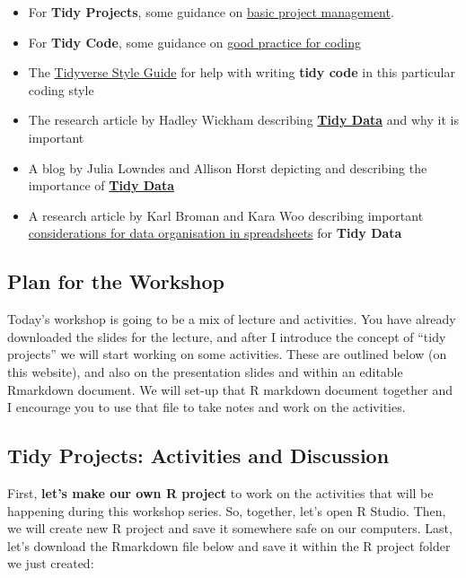 \documentclass[
]{book}
\begin{document}
\begin{itemize}
\item
  For \textbf{Tidy Projects}, some guidance on \href{https://environmentalcomputing.net/getting-started-with-r/project-management/}{basic project management}.
\item
  For \textbf{Tidy Code}, some guidance on \href{https://environmentalcomputing.net/coding-skills/good-practice/}{good practice for coding}
\item
  The \href{https://style.tidyverse.org/}{Tidyverse Style Guide} for help with writing \textbf{tidy code} in this particular coding style
\item
  The research article by Hadley Wickham describing \textbf{\href{https://vita.had.co.nz/papers/tidy-data.pdf}{Tidy Data}} and why it is important
\item
  A blog by Julia Lowndes and Allison Horst depicting and describing the importance of \textbf{\href{https://openscapes.org/blog/2020-10-12-tidy-data/}{Tidy Data}}
\item
  A research article by Karl Broman and Kara Woo describing important \href{https://www.tandfonline.com/doi/full/10.1080/00031305.2017.1375989}{considerations for data organisation in spreadsheets} for \textbf{Tidy Data}
\end{itemize}

\subsection{Plan for the Workshop}\label{plan-for-the-workshop}

Today's workshop is going to be a mix of lecture and activities. You have already downloaded the slides for the lecture, and after I introduce the concept of ``tidy projects'' we will start working on some activities. These are outlined below (on this website), and also on the presentation slides and within an editable Rmarkdown document. We will set-up that R markdown document together and I encourage you to use that file to take notes and work on the activities.

\subsection{Tidy Projects: Activities and Discussion}\label{tidy-projects-activities-and-discussion}

First, \textbf{let's make our own R project} to work on the activities that will be happening during this workshop series. So, together, let's open R Studio. Then, we will create new R project and save it somewhere safe on our computers. Last, let's download the Rmarkdown file below and save it within the R project folder we just created:
\end{document}
